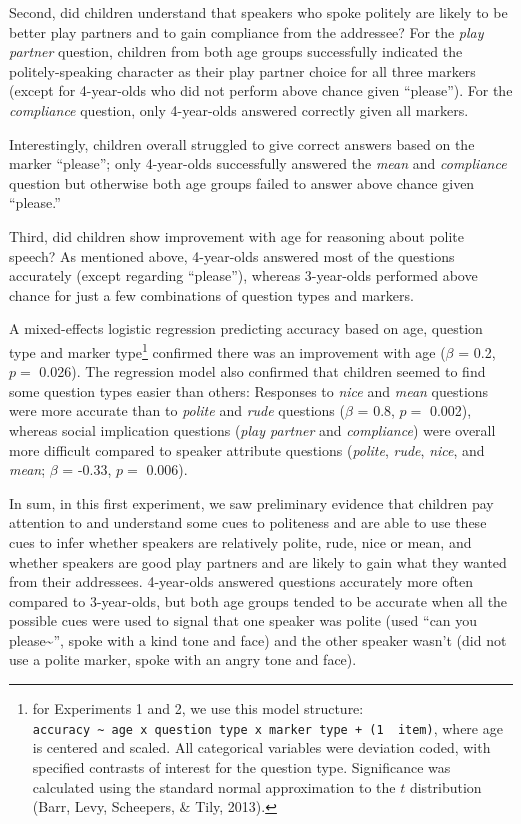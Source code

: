\documentclass[10pt, letterpaper]{article}
\begin{document}
Second, did children understand that speakers who spoke politely are
likely to be better play partners and to gain compliance from the
addressee? For the \emph{play partner} question, children from both age
groups successfully indicated the politely-speaking character as their
play partner choice for all three markers (except for 4-year-olds who
did not perform above chance given ``please''). For the
\emph{compliance} question, only 4-year-olds answered correctly given
all markers.

Interestingly, children overall struggled to give correct answers based
on the marker ``please''; only 4-year-olds successfully answered the
\emph{mean} and \emph{compliance} question but otherwise both age groups
failed to answer above chance given ``please.''

Third, did children show improvement with age for reasoning about polite
speech? As mentioned above, 4-year-olds answered most of the questions
accurately (except regarding ``please''), whereas 3-year-olds performed
above chance for just a few combinations of question types and markers.

A mixed-effects logistic regression predicting accuracy based on age,
question type and marker type\footnote{for Experiments 1 and 2, we use
  this model structure:
  \texttt{accuracy\ \textasciitilde{}\ age\ x\ question\ type\ x\ marker\ type\ +\ (1\ \textbar{}\ item)},
  where age is centered and scaled. All categorical variables were
  deviation coded, with specified contrasts of interest for the question
  type. Significance was calculated using the standard normal
  approximation to the \(t\) distribution (Barr, Levy, Scheepers, \&
  Tily, 2013).} confirmed there was an improvement with age (\(\beta\) =
0.2, \(p =\) 0.026). The regression model also confirmed that children
seemed to find some question types easier than others: Responses to
\emph{nice} and \emph{mean} questions were more accurate than to
\emph{polite} and \emph{rude} questions (\(\beta\) = 0.8, \(p =\)
0.002), whereas social implication questions (\emph{play partner} and
\emph{compliance}) were overall more difficult compared to speaker
attribute questions (\emph{polite}, \emph{rude}, \emph{nice}, and
\emph{mean}; \(\beta\) = -0.33, \(p =\) 0.006).

In sum, in this first experiment, we saw preliminary evidence that
children pay attention to and understand some cues to politeness and are
able to use these cues to infer whether speakers are relatively polite,
rude, nice or mean, and whether speakers are good play partners and are
likely to gain what they wanted from their addressees. 4-year-olds
answered questions accurately more often compared to 3-year-olds, but
both age groups tended to be accurate when all the possible cues were
used to signal that one speaker was polite (used ``can you
please\textasciitilde{}'', spoke with a kind tone and face) and the
other speaker wasn't (did not use a polite marker, spoke with an angry
tone and face).
\end{document}
